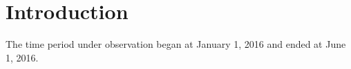 \chapter{Introduction}
The time period \timeperiod{} under observation began at January 1, 2016 and ended at June 1, 2016.